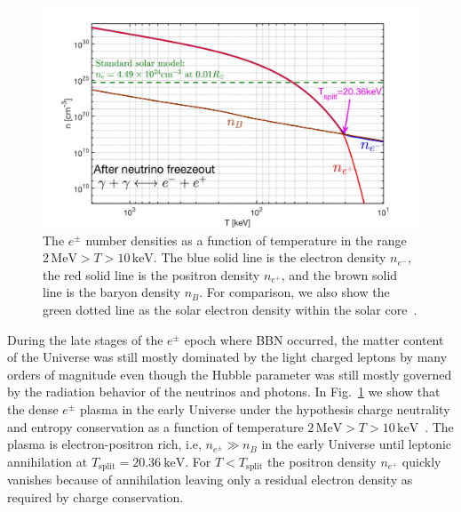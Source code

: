 \documentclass[universe,article,submit,moreauthors,pdftex,a4paper]{Definitions/mdpi}
\newcommand*{\rf}[1]{Fig.~{\ref{#1}}}
\begin{document}
\begin{figure}[ht]
\centerline{\includegraphics[width=\textwidth]{./plots/NewDensity_cm3.jpg}}
\caption{The $e^{\pm}$ number densities as a function of temperature in the range $2\,\mathrm{MeV}>T>10\,\mathrm{keV}$. The blue solid line is the electron density $n_{e^{-}}$, the red solid line is the positron density $n_{e^{+}}$, and the brown solid line is the baryon density $n_{B}$. For comparison, we also show the green dotted line as the solar electron density within the solar core~\cite{Bahcall:2000nu}.}
\label{Density_fig} 
\end{figure}

During the late stages of the $e^{\pm}$ epoch where BBN occurred, the matter content of the Universe was still mostly dominated by the light charged leptons by many orders of magnitude even though the Hubble parameter was still mostly governed by the radiation behavior of the neutrinos and photons. In \rf{Density_fig} we show that the dense $e^{\pm}$ plasma in the early Universe under the hypothesis charge neutrality and entropy conservation as a function of temperature $2\,\mathrm{MeV}>T>10\,\mathrm{keV}$~\cite{Chris:2023abc}. The plasma is electron-positron rich, i.e, $n_{e^\pm}\gg n_B$ in the early Universe until leptonic annihilation at $T_{\mathrm{split}} = 20.36\ \mathrm{keV}$. For $T<T_{\mathrm{split}}$ the positron density $n_{e^{+}}$ quickly vanishes because of annihilation leaving only a residual electron density as required by charge conservation.
\end{document}

